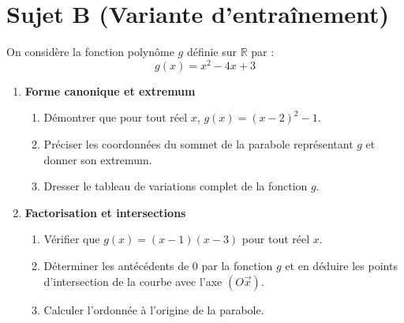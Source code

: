 \documentclass[11pt,a4paper]{article}
\begin{document}
\vspace{0.5cm}

\section*{Sujet B (Variante d'entraînement)}

On considère la fonction polynôme $g$ définie sur $\mathbb{R}$ par :
$$g(x) = x^2 - 4x + 3$$

\begin{enumerate}
    \item \textbf{Forme canonique et extremum}
    \begin{enumerate}
        \item Démontrer que pour tout réel $x$, $g(x) = (x - 2)^2 - 1$.
        \item Préciser les coordonnées du sommet de la parabole représentant $g$ et donner son extremum.
        \item Dresser le tableau de variations complet de la fonction $g$.
    \end{enumerate}
    \item \textbf{Factorisation et intersections}
    \begin{enumerate}
        \item Vérifier que $g(x) = (x - 1)(x - 3)$ pour tout réel $x$.
        \item Déterminer les antécédents de $0$ par la fonction $g$ et en déduire les points d'intersection de la courbe avec l'axe $(O\vec{x})$.
        \item Calculer l'ordonnée à l'origine de la parabole.
    \end{enumerate}
\end{enumerate}
\end{document}
